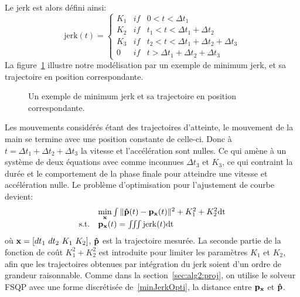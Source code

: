 Le jerk est alors défini ainsi:
\begin{equation}
  \mathrm{jerk}(t) =
  \left\{
      \begin{array}{rll}
        K_1& if& 0<t< \Delta t_1 \\
        K_2& if& t_1<t< \Delta t_1 + \Delta t_2\\
        K_3& if& t_2<t< \Delta t_1 + \Delta t_2 + \Delta t_3\\
	0& if& t> \Delta t_1 + \Delta t_2 + \Delta t_3
      \end{array}
    \right.
\label{jerk}
\end{equation}
La figure~\ref{fig:jerk} illustre notre modélisation par un exemple de minimum jerk, et 
sa trajectoire en position correspondante.
\begin{figure}[t]
\begin{center}
    \resizebox{0.4\textwidth}{!} {
      
    }
\end{center}
\caption{Un exemple de minimum jerk et sa trajectoire en position correspondante.}
\label{fig:jerk}
\end{figure}

Les mouvements considérés étant des trajectoires
d'atteinte, le mouvement de la main se termine
avec une position constante de celle-ci.
Donc à $t = \Delta t_1 + \Delta t_2 + \Delta t_3$ la vitesse et l'accélération
sont nulles. Ce qui amène à un système de deux équations
avec comme inconnues $\Delta t_3$ et $K_3$, ce qui contraint la durée et le
comportement de la phase finale pour atteindre une vitesse et accélération nulle. 
Le problème d'optimisation pour l'ajustement de courbe devient:
\begin{equation}
\begin{array}{ll}
  & \underset{\mbf{x}}\min \int \Vert \mbf{\hat{p}}(t) - \mbf{p}_\mbf{x}(t) \Vert ^2 + K_1^2 + K_2^2 \mathrm{dt}\\
  \text{s.t.} & \mbf{p}_\mbf{x}(t) = \iiint \mathrm{jerk}(t) \mathrm{dt}
\end{array}
\label{minJerkOpti}
\end{equation}
\noindent où ${\mathbf{x}}=[dt_1\ dt_2\ K_1\ K_2]$, ${\mathbf{\hat{p}}}$ est la trajectoire mesurée.
La seconde partie de la fonction de coût $K_1^2 + K_2^2$ est introduite
pour limiter les paramètres $K_1$ et $K_2$,
afin que les trajectoires obtenues par intégration du jerk soient 
d'un ordre de grandeur raisonnable. Comme dans la section~\ref{sec:alg2:proj}, on utilise le solveur 
FSQP avec une forme discrétisée de~\eqref{minJerkOpti}, la distance entre ${\mathbf{p}}_{\mathbf{x}}$ et ${\mathbf{\hat{p}}}$.

